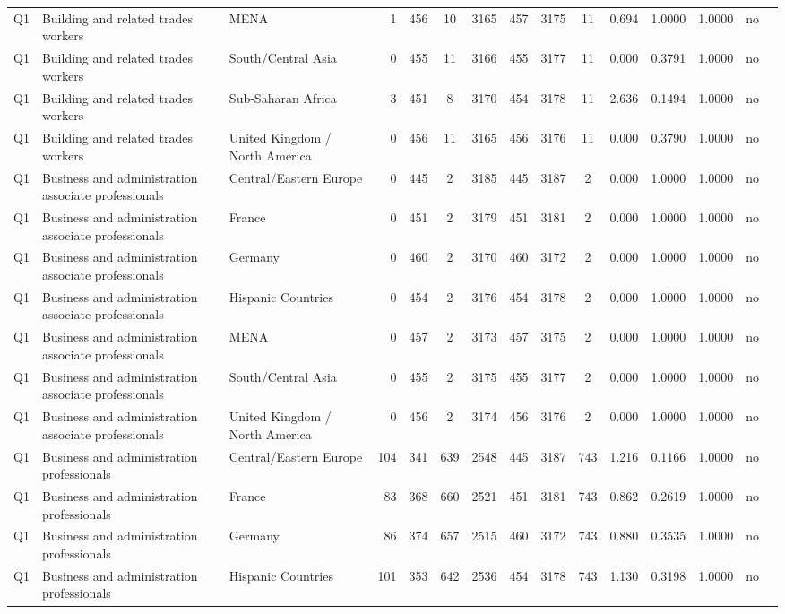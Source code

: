 \begin{longtable}{lllrcccccccccll}
Q1 & Building and related trades workers & MENA & 1 & 456 & 10 & 3165 & 457 & 3175 & 11 & 0.694 & 1.0000 & 1.0000 & no \\
Q1 & Building and related trades workers & South/Central Asia & 0 & 455 & 11 & 3166 & 455 & 3177 & 11 & 0.000 & 0.3791 & 1.0000 & no \\
Q1 & Building and related trades workers & Sub-Saharan Africa & 3 & 451 & 8 & 3170 & 454 & 3178 & 11 & 2.636 & 0.1494 & 1.0000 & no \\
Q1 & Building and related trades workers & United Kingdom / North America & 0 & 456 & 11 & 3165 & 456 & 3176 & 11 & 0.000 & 0.3790 & 1.0000 & no \\
Q1 & Business and administration associate professionals & Central/Eastern Europe & 0 & 445 & 2 & 3185 & 445 & 3187 & 2 & 0.000 & 1.0000 & 1.0000 & no \\
Q1 & Business and administration associate professionals & France & 0 & 451 & 2 & 3179 & 451 & 3181 & 2 & 0.000 & 1.0000 & 1.0000 & no \\
Q1 & Business and administration associate professionals & Germany & 0 & 460 & 2 & 3170 & 460 & 3172 & 2 & 0.000 & 1.0000 & 1.0000 & no \\
Q1 & Business and administration associate professionals & Hispanic Countries & 0 & 454 & 2 & 3176 & 454 & 3178 & 2 & 0.000 & 1.0000 & 1.0000 & no \\
Q1 & Business and administration associate professionals & MENA & 0 & 457 & 2 & 3173 & 457 & 3175 & 2 & 0.000 & 1.0000 & 1.0000 & no \\
Q1 & Business and administration associate professionals & South/Central Asia & 0 & 455 & 2 & 3175 & 455 & 3177 & 2 & 0.000 & 1.0000 & 1.0000 & no \\
Q1 & Business and administration associate professionals & United Kingdom / North America & 0 & 456 & 2 & 3174 & 456 & 3176 & 2 & 0.000 & 1.0000 & 1.0000 & no \\
Q1 & Business and administration professionals & Central/Eastern Europe & 104 & 341 & 639 & 2548 & 445 & 3187 & 743 & 1.216 & 0.1166 & 1.0000 & no \\
Q1 & Business and administration professionals & France & 83 & 368 & 660 & 2521 & 451 & 3181 & 743 & 0.862 & 0.2619 & 1.0000 & no \\
Q1 & Business and administration professionals & Germany & 86 & 374 & 657 & 2515 & 460 & 3172 & 743 & 0.880 & 0.3535 & 1.0000 & no \\
Q1 & Business and administration professionals & Hispanic Countries & 101 & 353 & 642 & 2536 & 454 & 3178 & 743 & 1.130 & 0.3198 & 1.0000 & no \\

\end{longtable}
